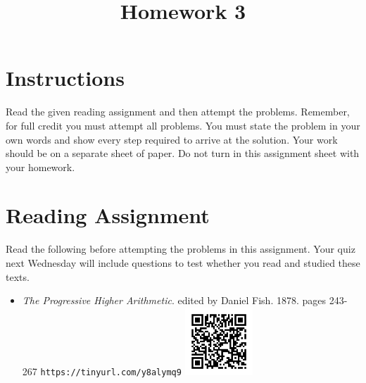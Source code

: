 \documentclass{article}
\title{Homework 3}
\date{}
\begin{document}
\maketitle

\section*{Instructions}
Read the given reading assignment and then attempt the problems.  Remember, for full
credit you must attempt all problems.  You must state the problem in your own words and show every step required to arrive at the solution.  Your work should be on a separate sheet of paper.  Do not turn in this assignment sheet with your homework.

\section*{Reading Assignment}
Read the following before attempting the problems in this assignment.  
Your quiz next Wednesday will include questions to test whether you read and studied
these texts.
\begin{itemize}
\item  {\em The Progressive Higher Arithmetic}. edited by Daniel Fish. 1878. pages 243-267\newline
{\tt https://tinyurl.com/y8alymq9}\newline
\includegraphics[height=1in]{readings/higher1}
\end{itemize}
\end{document}
